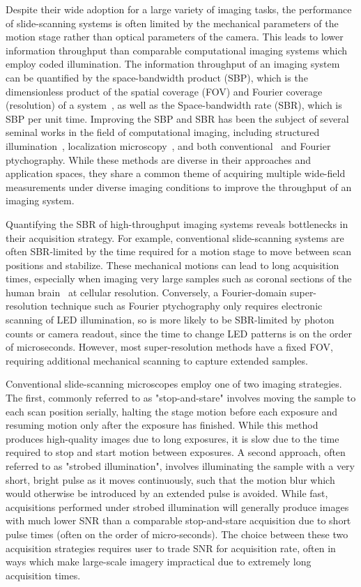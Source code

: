 Despite their wide adoption for a large variety of imaging tasks, the performance of slide-scanning systems is often limited by the mechanical parameters of the motion stage rather than optical parameters of the camera. This leads to lower information throughput than comparable computational imaging systems which employ coded illumination. The information throughput of an imaging system can be quantified by the space-bandwidth product (SBP), which is the dimensionless product of the spatial coverage (FOV) and Fourier coverage (resolution) of a system~\cite{Lohmann1996space}, as well as the Space-bandwidth rate (SBR), which is SBP per unit time. Improving the SBP and SBR has been the subject of several seminal works in the field of computational imaging, including structured illumination~\cite{gustafsson2000surpassing}, localization microscopy~\cite{Rust:06, betzig2006imaging}, and both conventional~\cite{rodenburg2004phase} and Fourier~\cite{Zheng2013,tian2015computational,Tian2014} ptychography. While these methods are diverse in their approaches and application spaces, they share a common theme of acquiring multiple wide-field measurements under diverse imaging conditions to improve the throughput of an imaging system.

Quantifying the SBR of high-throughput imaging systems reveals bottlenecks in their acquisition strategy. For example, conventional slide-scanning systems are often SBR-limited by the time required for a motion stage to move between scan positions and stabilize. These mechanical motions can lead to long acquisition times, especially when imaging very large samples such as coronal sections of the human brain~\cite{Grinberg2007} at cellular resolution.
Conversely, a Fourier-domain super-resolution technique such as Fourier ptychography only requires electronic scanning of LED illumination, so is more likely to be SBR-limited by photon counts or camera readout, since the time to change LED patterns is on the order of microseconds. However, most super-resolution methods have a fixed FOV, requiring additional mechanical scanning to capture extended samples.

Conventional slide-scanning microscopes employ one of two imaging strategies. The first, commonly referred to as "stop-and-stare" involves moving the sample to each scan position serially, halting the stage motion before each exposure and resuming motion only after the exposure has finished. While this method produces high-quality images due to long exposures, it is slow due to the time required to stop and start motion between exposures. A second approach, often referred to as "strobed illumination", involves illuminating the sample with a very short, bright pulse as it moves continuously, such that the motion blur which would otherwise be introduced by an extended pulse is avoided. While fast, acquisitions performed under strobed illumination will generally produce images with much lower SNR than a comparable stop-and-stare acquisition due to short pulse times (often on the order of micro-seconds). The choice between these two acquisition strategies requires user to trade SNR for acquisition rate, often in ways which make large-scale imagery impractical due to extremely long acquisition times.

